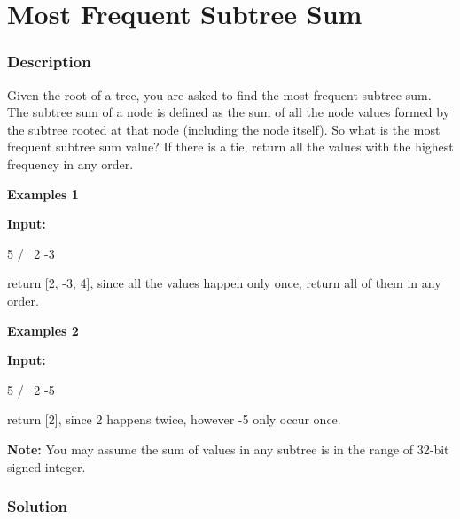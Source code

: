 \newpage

\section{Most Frequent Subtree Sum} %

\subsubsection{Description}
Given the root of a tree, you are asked to find the most frequent subtree sum. The subtree sum of a node is defined as the sum of all the node values formed by the subtree rooted at that node (including the node itself). So what is the most frequent subtree sum value? If there is a tie, return all the values with the highest frequency in any order.

\textbf{Examples 1}

\textbf{Input:}
\begin{Code}
  5
 /  \
2   -3
\end{Code}

return [2, -3, 4], since all the values happen only once, return all of them in any order.

\textbf{Examples 2}

\textbf{Input:}
\begin{Code}
  5
 /  \
2   -5
\end{Code}

return [2], since 2 happens twice, however -5 only occur once.

\textbf{Note:} You may assume the sum of values in any subtree is in the range of 32-bit signed integer.

\newpage

\subsubsection{Solution}

